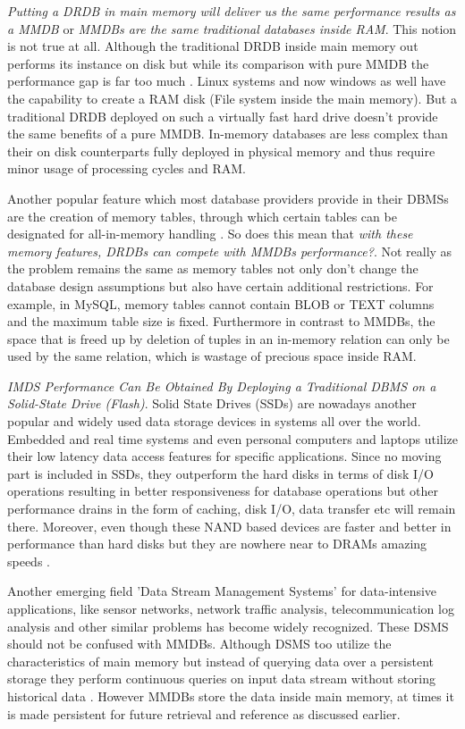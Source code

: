 \documentclass[12pt]{article} %
\begin{document}
\emph{Putting a DRDB in main memory will deliver us the same performance results as a MMDB} or \emph{MMDBs are the same traditional databases inside RAM}. This notion is not true at all. Although the traditional DRDB inside main memory out performs its instance on disk but while its comparison with pure MMDB the performance gap is far too much \cite{Mcobject-ramdisk}. Linux systems and now windows as well have the capability to create a RAM disk (File system inside the main memory). But a traditional DRDB deployed on such a virtually fast hard drive doesn't provide the same benefits of a pure MMDB. In-memory databases are less complex than their on disk counterparts fully deployed in physical memory and thus require minor usage of processing cycles and RAM.

Another popular feature which most database providers provide in their DBMSs are the creation of memory tables, through which certain tables can be designated for all-in-memory handling \cite{Mcobject-Myths}. So does this mean that \emph{with these memory features, DRDBs can compete with MMDBs performance?}. Not really as the problem remains the same as memory tables not only don't change the database design assumptions but also have certain additional restrictions. For example, in MySQL, memory tables cannot contain BLOB or TEXT columns and the maximum table size is fixed. Furthermore in contrast to MMDBs, the space that is freed up by deletion of tuples in an in-memory relation can only be used by the same relation, which is wastage of precious space inside RAM.

\emph{ IMDS Performance Can Be Obtained By Deploying a Traditional DBMS on a Solid-State Drive (Flash)}. Solid State Drives (SSDs) are nowadays another popular and widely used data storage devices in systems all over the world. Embedded and real time systems and even personal computers and laptops utilize their low latency data access features for specific applications. Since no moving part is included in SSDs, they outperform the hard disks in terms of disk I/O operations resulting in better responsiveness for database operations \cite{Mcobject-Myths} but other performance drains in the form of caching, disk I/O, data transfer etc will remain there. Moreover, even though these NAND based devices are faster and better in performance than hard disks but they are nowhere near to DRAMs amazing speeds \cite{ssds}. 

Another emerging field 'Data Stream Management Systems' for data-intensive applications, like sensor networks, network traffic analysis, telecommunication log analysis and other similar problems has become widely recognized. These DSMS should not be confused with MMDBs. Although DSMS too utilize the characteristics of main memory but instead of querying data over a persistent storage they perform continuous queries on input data stream without storing historical data \cite{goebel2005DSMS}. However MMDBs store the data inside main memory, at times it is made persistent for future retrieval and reference as discussed earlier. 
\end{document}
